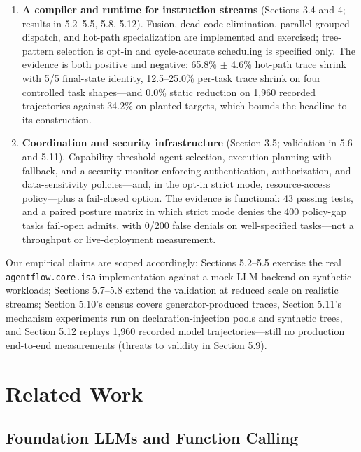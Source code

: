 \documentclass[
  sigconf,
  anonymous]{acmart}
\begin{document}
\begin{enumerate}
  second model performs), with every observation-wired specification
  failing.
\item
  \textbf{A compiler and runtime for instruction streams} (Sections 3.4
  and 4; results in 5.2--5.5, 5.8, 5.12). Fusion, dead-code elimination,
  parallel-grouped dispatch, and hot-path specialization are implemented
  and exercised; tree-pattern selection is opt-in and cycle-accurate
  scheduling is specified only. The evidence is both positive and
  negative: 65.8\% \(\pm\) 4.6\% hot-path trace shrink with 5/5
  final-state identity, 12.5--25.0\% per-task trace shrink on four
  controlled task shapes---and 0.0\% static reduction on 1,960 recorded
  trajectories against 34.2\% on planted targets, which bounds the
  headline to its construction.
\item
  \textbf{Coordination and security infrastructure} (Section 3.5;
  validation in 5.6 and 5.11). Capability-threshold agent selection,
  execution planning with fallback, and a security monitor enforcing
  authentication, authorization, and data-sensitivity policies---and, in
  the opt-in strict mode, resource-access policy---plus a fail-closed
  option. The evidence is functional: 43 passing tests, and a paired
  posture matrix in which strict mode denies the 400 policy-gap tasks
  fail-open admits, with 0/200 false denials on well-specified
  tasks---not a throughput or live-deployment measurement.
\end{enumerate}

Our empirical claims are scoped accordingly: Sections 5.2--5.5 exercise
the real \texttt{agentflow.core.isa} implementation against a mock LLM
backend on synthetic workloads; Sections 5.7--5.8 extend the validation
at reduced scale on realistic streams; Section 5.10's census covers
generator-produced traces, Section 5.11's mechanism experiments run on
declaration-injection pools and synthetic trees, and Section 5.12
replays 1,960 recorded model trajectories---still no production
end-to-end measurements (threats to validity in Section 5.9).

\section{Related Work}\label{related-work}

\subsection{Foundation LLMs and Function
Calling}\label{foundation-llms-and-function-calling}
\end{document}

